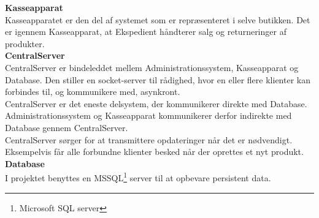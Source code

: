 \textbf{Kasseapparat}\\
Kasseapparatet er den del af systemet som er repræsenteret i selve butikken. Det er igennem Kasseapparat, at Ekspedient håndterer salg og returneringer af produkter. \\

\textbf{CentralServer}\\
CentralServer er bindeleddet mellem Administrationssystem, Kasseapparat og Database. Den stiller en socket-server til rådighed, hvor en eller flere klienter kan forbindes til, og kommunikere med, asynkront.\\

CentralServer er det eneste delsystem, der kommunikerer direkte med Database. Administrationssystem og Kasseapparat kommunikerer derfor indirekte med Database gennem CentralServer.\\

CentralServer sørger for at transmittere opdateringer når det er nødvendigt. Eksempelvis får alle forbundne klienter besked når der oprettes et nyt produkt.\\

\textbf{Database}\\
I projektet benyttes en MSSQL\footnote{Microsoft SQL server} server til at opbevare persistent data.
